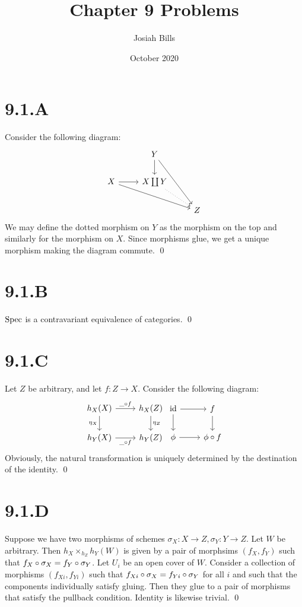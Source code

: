 \documentclass{article}
\title{Chapter 9 Problems}
\author{Josiah Bills}
\date{October 2020}
\begin{document}
\maketitle

\section{9.1.A}
Consider the following diagram: \[
    \begin{tikzcd}
                          & Y \ar[d] \ar[ddr]               \\
        X \ar[r] \ar[rrd] & X \coprod Y \ar[dr, dotted]     \\
                          &                             & Z
    \end{tikzcd}
\] We may define the dotted
morphism on $Y$ as the morphism on the top and similarly for
the morphism on $X$. Since morphisms glue, we get a unique
morphism making the diagram commute. \qed

\section{9.1.B}
$\operatorname{Spec}$ is a contravariant equivalence of categories. \qed

\section{9.1.C}
Let $Z$ be arbitrary, and let $f: Z \to X$. Consider
the following diagram: \[
    \begin{tikzcd}
        h_X(X) \ar[d, "\eta_X", swap] \ar[r, "\_ \after f"] & h_X(Z)  \ar[d, "\eta_Z"] \\
        h_Y(X)                  \ar[r, "\_ \after f", swap] & h_Y(Z)
    \end{tikzcd}
    \begin{tikzcd}
        \text{id} \ar[d] \ar[r] & f \ar[d]      \\
        \phi             \ar[r] & \phi \after f
    \end{tikzcd}
\] Obviously, the natural
transformation is uniquely determined by the destination of the identity. \qed

\section{9.1.D}
Suppose we have two morphisms of schemes $\sigma_X: X \to Z, \sigma_Y: Y \to Z$. Let
$W$ be arbitrary. Then $h_X \times_{h_Z} h_Y(W)$ is given by a
pair of morphsims $(f_X, f_Y)$ such that $f_X \circ \sigma_X=f_Y \circ \sigma_Y$. Let
$U_i$ be an open cover of $W$. Consider a
collection of morphisms $(f_{Xi}, f_{Yi})$ such that $f_{Xi} \circ \sigma_X=f_{Yi} \circ \sigma_Y$
for all $i$ and such that the components individually
satisfy gluing. Then they glue to a pair of morphisms that satisfy the pullback
condition. Identity is likewise trivial. \qed
\end{document}
